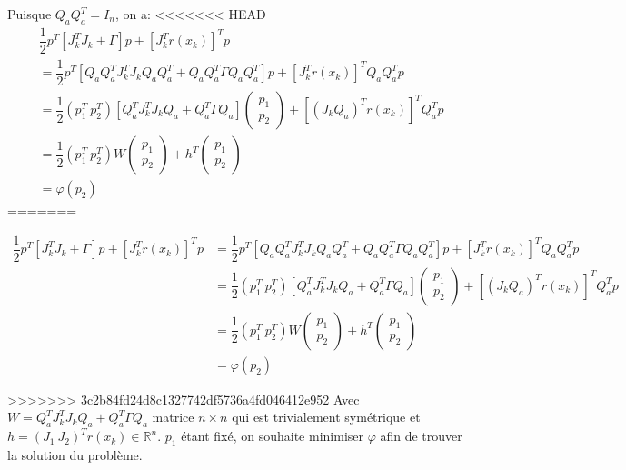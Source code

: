 \documentclass[a4paper,11pt]{article}
\numberwithin{equation}{section}
\begin{document}
Puisque $Q_{a}Q_{a}^T = I_n$, on a:
<<<<<<< HEAD
\begin{align*}
&\dfrac{1}{2}p^T\left[J_{k}^TJ_{k} + \Gamma\right]p + \left[J_{k}^Tr(x_{k})\right]^Tp \\
&= \dfrac{1}{2}p^T\left[Q_{a}Q_{a}^TJ_{k}^TJ_{k}Q_{a}Q_{a}^T + Q_{a}Q_{a}^T\Gamma Q_{a}Q_{a}^T\right]p + \left[J_{k}^Tr(x_{k})\right]^TQ_{a}Q_{a}^Tp \\
&= \dfrac{1}{2}(p_1^T\ p_2^T) \left[Q_{a}^TJ_{k}^TJ_{k}Q_{a} + Q_{a}^T\Gamma Q_{a}\right]\begin{pmatrix} p_1 \\ p_2\end{pmatrix} + \left[(J_{k}Q_{a})^Tr(x_{k})\right]^TQ_{a}^{T}p\\
&= \dfrac{1}{2}(p_1^T\ p_2^T)W\begin{pmatrix}p_1\\p_2\end{pmatrix} + h^T\begin{pmatrix}p_1\\p_2\end{pmatrix} \\
&= \varphi(p_2)
\end{align*}
=======

$$
\begin{aligned} 
\dfrac{1}{2}p^T\left[J_{k}^TJ_{k} + \Gamma\right]p + \left[J_{k}^Tr(x_{k})\right]^Tp &= \dfrac{1}{2}p^T\left[Q_{a}Q_{a}^TJ_{k}^TJ_{k}Q_{a}Q_{a}^T + Q_{a}Q_{a}^T\Gamma Q_{a}Q_{a}^T\right]p + \left[J_{k}^Tr(x_{k})\right]^TQ_{a}Q_{a}^Tp \\
&= \dfrac{1}{2}(p_1^T\ p_2^T) \left[Q_{a}^TJ_{k}^TJ_{k}Q_{a} + Q_{a}^T\Gamma Q_{a}\right]\begin{pmatrix} p_1 \\ p_2\end{pmatrix} + \left[(J_{k}Q_{a})^Tr(x_{k})\right]^TQ_{a}^{T}p\\
&= \dfrac{1}{2}(p_1^T\ p_2^T)W\begin{pmatrix}p_1\\p_2\end{pmatrix} + h^T\begin{pmatrix}p_1\\p_2\end{pmatrix} \\
&= \varphi(p_2)
\end{aligned}
$$

>>>>>>> 3c2b84fd24d8c1327742df5736a4fd046412e952
Avec $W = Q_{a}^TJ_{k}^TJ_{k}Q_{a} + Q_{a}^T\Gamma Q_{a}$ matrice $n\times n$ qui est trivialement symétrique et $h = (J_1\ J_2)^Tr(x_{k}) \in \mathbb{R}^n$. $p_1$ étant fixé, on souhaite minimiser $\varphi$ afin de trouver la solution du problème.
\end{document}
